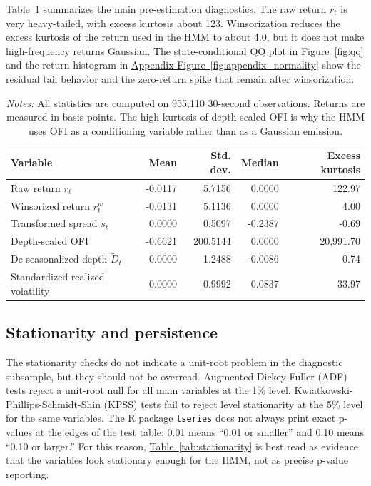 \documentclass[12pt,a4paper]{article}
\newcommand{\tabref}[1]{\hyperref[#1]{Table~\ref*{#1}}}
\newcommand{\figref}[1]{\hyperref[#1]{Figure~\ref*{#1}}}
\newcommand{\appfigref}[1]{\hyperref[#1]{Appendix Figure~\ref*{#1}}}
\begin{document}
\tabref{tab:diagnostics} summarizes the main pre-estimation diagnostics. The raw return \(r_t\) is very heavy-tailed, with excess kurtosis about 123. Winsorization reduces the excess kurtosis of the return used in the HMM to about 4.0, but it does not make high-frequency returns Gaussian. The state-conditional QQ plot in \figref{fig:qq} and the return histogram in \appfigref{fig:appendix_normality} show the residual tail behavior and the zero-return spike that remain after winsorization.

\begin{table}[htbp]
\centering
\caption{Selected diagnostics for model variables}
\small
\begin{tabular}{lrrrr}
\toprule
\textbf{Variable} & \textbf{Mean} & \textbf{Std. dev.} & \textbf{Median} & \textbf{Excess kurtosis} \\
\midrule
Raw return \(r_t\) & -0.0117 & 5.7156 & 0.0000 & 122.97 \\
Winsorized return \(r_t^w\) & -0.0131 & 5.1136 & 0.0000 & 4.00 \\
Transformed spread \(\tilde{s}_t\) & 0.0000 & 0.5097 & -0.2387 & -0.69 \\
Depth-scaled OFI & -0.6621 & 200.5144 & 0.0000 & 20,991.70 \\
De-seasonalized depth \(\tilde{D}_t\) & 0.0000 & 1.2488 & -0.0086 & 0.74 \\
Standardized realized volatility & 0.0000 & 0.9992 & 0.0837 & 33.97 \\
\bottomrule
\end{tabular}
\caption*{\footnotesize\emph{Notes:} All statistics are computed on 955,110 30-second observations. Returns are measured in basis points. The high kurtosis of depth-scaled OFI is why the HMM uses OFI as a conditioning variable rather than as a Gaussian emission.}
\label{tab:diagnostics}
\end{table}

\subsection{Stationarity and persistence}\label{sec:stationarity}

The stationarity checks do not indicate a unit-root problem in the diagnostic subsample, but they should not be overread. Augmented Dickey-Fuller (ADF) tests reject a unit-root null for all main variables at the 1\% level. Kwiatkowski-Phillips-Schmidt-Shin (KPSS) tests fail to reject level stationarity at the 5\% level for the same variables. The R package \texttt{tseries} does not always print exact p-values at the edges of the test table: 0.01 means ``0.01 or smaller'' and 0.10 means ``0.10 or larger.'' For this reason, \tabref{tab:stationarity} is best read as evidence that the variables look stationary enough for the HMM, not as precise p-value reporting.
\end{document}
